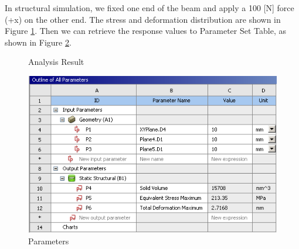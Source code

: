 \documentclass[12pt]{kjleehw}
\begin{document}
\begin{CJK}{UTF8}{bkai}
In structural simulation, we fixed one end of the beam and apply a 100 [N] force (+x) on the other end. The stress and deformation distribution are shown in Figure \ref{fig:anslysis}. Then we can retrieve the response values to Parameter Set Table, as shown in Figure \ref{fig:parameters}.

\begin{figure}[h]
	\centering
  \caption{Analysis Result}
  \label{fig:anslysis}
\end{figure}

\begin{figure}[h]
	\centering
	\includegraphics[scale=0.65]{figure/parameters.png}
	\caption{Parameters}
	\label{fig:parameters}
\end{figure}


\end{CJK}
\end{document}

